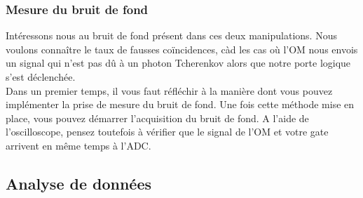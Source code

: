 \subsubsection{Mesure du bruit de fond}

Intéressons nous au bruit de fond présent dans ces deux manipulations. Nous voulons connaître le taux de fausses coïncidences, càd les cas où l'OM nous envois un signal qui n'est pas dû à un photon Tcherenkov alors que notre porte logique s'est déclenchée. \\

Dans un premier temps, il vous faut réfléchir à la manière dont vous pouvez implémenter la prise de mesure du bruit de fond. Une fois cette méthode mise en place, vous pouvez démarrer l'acquisition du bruit de fond. A l'aide de l'oscilloscope, pensez toutefois à vérifier que le signal de l'OM et votre gate arrivent en même temps à l'ADC.


\subsection{Analyse de donn\'ees}

